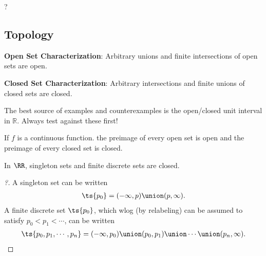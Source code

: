 \begin{definition}[Bounded]

? 

\end{definition}

\hypertarget{topology}{%
\subsection{Topology}\label{topology}}

\begin{definition}

\textbf{Open Set Characterization}: Arbitrary unions and finite
intersections of open sets are open.

\textbf{Closed Set Characterization}: Arbitrary intersections and finite
unions of closed sets are closed.

\end{definition}

\begin{remark}

The best source of examples and counterexamples is the open/closed unit
interval in \(\mathbb{R}\). Always test against these first!

\end{remark}

\begin{remark}

If \(f\) is a continuous function. the preimage of every open set is
open and the preimage of every closed set is closed.

\end{remark}

\begin{proposition}[?]

In \(\RR\), singleton sets and finite discrete sets are closed.

\end{proposition}

\begin{proof}[?]

A singleton set can be written
\begin{align*}  
\ts{p_0} = (-\infty, p) \union (p, \infty)
.\end{align*} A finite discrete set \(\ts{p_0}\), which wlog (by
relabeling) can be assumed to satisfy \(p_0 < p_1 < \cdots\), can be
written
\begin{align*}  
\ts{p_0, p_1, \cdots, p_n} = (-\infty, p_0) \union (p_0, p_1) \union \cdots \union (p_n, \infty)
.\end{align*}

\end{proof}

